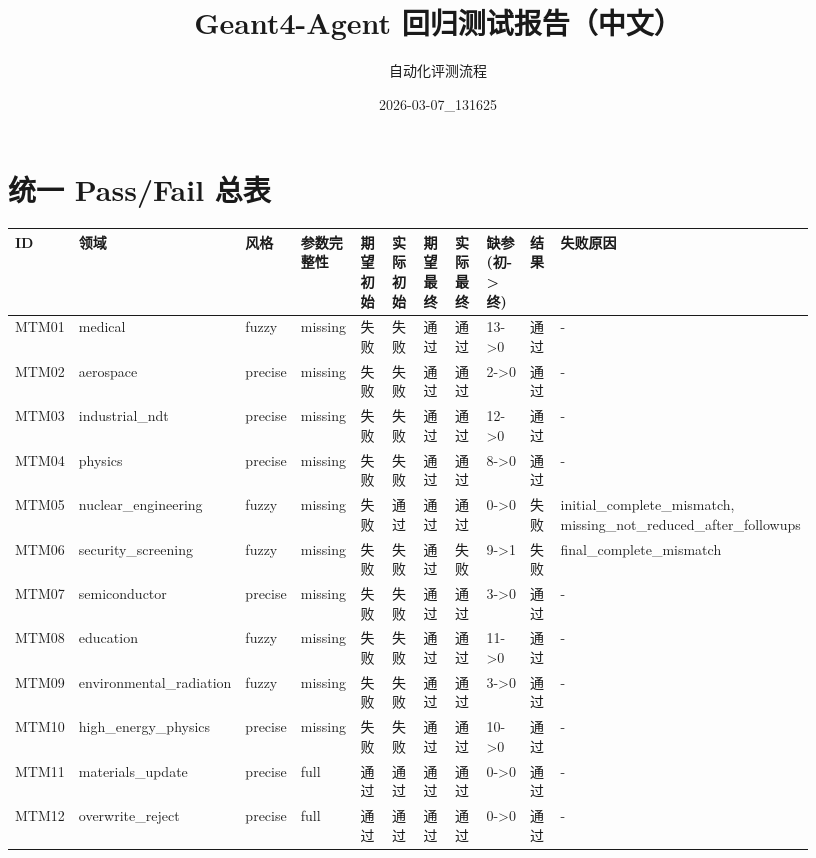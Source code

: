 \documentclass[11pt]{ctexart}
\title{Geant4-Agent 回归测试报告（中文）}
\author{自动化评测流程}
\date{2026-03-07\_131625}
\begin{document}
\maketitle
\section{统一 Pass/Fail 总表}
\begin{longtable}{p{0.06\linewidth}p{0.08\linewidth}p{0.07\linewidth}p{0.08\linewidth}p{0.07\linewidth}p{0.07\linewidth}p{0.07\linewidth}p{0.07\linewidth}p{0.09\linewidth}p{0.06\linewidth}p{0.21\linewidth}}
\toprule
ID & 领域 & 风格 & 参数完整性 & 期望初始 & 实际初始 & 期望最终 & 实际最终 & 缺参(初->终) & 结果 & 失败原因 \\
\midrule
MTM01 & medical & fuzzy & missing & 失败 & 失败 & 通过 & 通过 & 13->0 & 通过 & - \\
MTM02 & aerospace & precise & missing & 失败 & 失败 & 通过 & 通过 & 2->0 & 通过 & - \\
MTM03 & industrial\_ndt & precise & missing & 失败 & 失败 & 通过 & 通过 & 12->0 & 通过 & - \\
MTM04 & physics & precise & missing & 失败 & 失败 & 通过 & 通过 & 8->0 & 通过 & - \\
MTM05 & nuclear\_engineering & fuzzy & missing & 失败 & 通过 & 通过 & 通过 & 0->0 & 失败 & initial\_complete\_mismatch, missing\_not\_reduced\_after\_followups \\
MTM06 & security\_screening & fuzzy & missing & 失败 & 失败 & 通过 & 失败 & 9->1 & 失败 & final\_complete\_mismatch \\
MTM07 & semiconductor & precise & missing & 失败 & 失败 & 通过 & 通过 & 3->0 & 通过 & - \\
MTM08 & education & fuzzy & missing & 失败 & 失败 & 通过 & 通过 & 11->0 & 通过 & - \\
MTM09 & environmental\_radiation & fuzzy & missing & 失败 & 失败 & 通过 & 通过 & 3->0 & 通过 & - \\
MTM10 & high\_energy\_physics & precise & missing & 失败 & 失败 & 通过 & 通过 & 10->0 & 通过 & - \\
MTM11 & materials\_update & precise & full & 通过 & 通过 & 通过 & 通过 & 0->0 & 通过 & - \\
MTM12 & overwrite\_reject & precise & full & 通过 & 通过 & 通过 & 通过 & 0->0 & 通过 & - \\
\bottomrule
\end{longtable}
\end{document}
